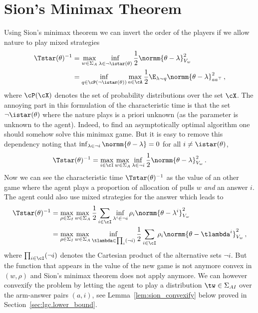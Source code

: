 \section{Sion's Minimax Theorem}\label{app:lgc.sion}

Using Sion's minimax theorem we can invert the order of the players if we allow nature to play mixed strategies
\begin{align}
\Tstar(\theta)^{-1} &= \max_{w \in \Sigma_A} \inf_{\lambda\in \neg \istar(\theta)} \frac{1}{2} \normm{\theta - \lambda}_{V_w}^2 \label{eq:sion} \\
&= \inf_{q\in \cP(\neg \istar(\theta))} \max_{a\in\cA}\frac{1}{2}\E_{\lambda\sim q}\normm{\theta - \lambda}_{aa^\top}^2\nonumber\,,
\end{align}
where $\cP(\cX)$ denotes the set of probability distributions over the set $\cX$. The annoying part in this formulation of the characteristic time is that the set $\neg \istar(\theta)$ where the nature plays is a priori unknown (as the parameter is unknown to the agent). Indeed, to find an asymptotically optimal algorithm one should somehow solve this minimax game. But it is easy to remove this dependency noting that $\inf_{\lambda\in\neg i}\normm{\theta -\lambda}=0$ for all $i\neq \istar(\theta)$,
\[
\Tstar(\theta)^{-1} = \max_{i\in\cI}\max_{w \in \Sigma_A} \inf_{\lambda\in \neg i } \frac{1}{2}\normm{\theta - \lambda}_{V_w}^2\,.
\]
Now we can see the characteristic time $\Tstar(\theta)^{-1}$ as the value of an other game where the agent plays a proportion of allocation of pulls $w$ \emph{and} an answer $i$. The agent could also use mixed strategies for the answer which leads to
\begin{align*}
\Tstar(\theta)^{-1} &= \max_{\rho\in\Sigma_I}\max_{w \in \Sigma_A}  \frac{1}{2}\sum_{i\in \cI }\inf_{\lambda^i\in\neg i}\rho_i\normm{\theta - \lambda^i}_{V_w}^2\\
& =\max_{\rho\in\Sigma_I}\max_{w \in \Sigma_A}\inf_{\tlambda\in\prod_i(\neg i)}  \frac{1}{2}\sum_{i\in \cI }\rho_i\normm{\theta - \tlambda^i}_{V_w}^2\,,
\end{align*}
where $\prod_{i\in\cI}(\neg i)$ denotes the Cartesian product of the alternative sets $\neg i$. But the function that appears in the value of the new game is not anymore convex in $(w,\rho)$ and Sion's minimax theorem does not apply anymore. We can however convexify the problem by letting the agent to play a distribution $\tw\in\Sigma_{AI}$ over the arm-answer pairs $(a,i)$, see Lemma~\ref{lem:sion_convexify} below proved in Section~\ref{sec:lgc.lower_bound}.
